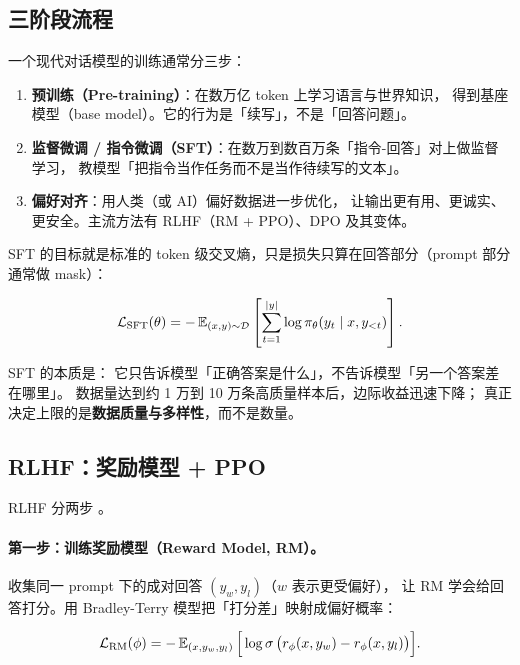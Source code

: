 \subsection{三阶段流程}

一个现代对话模型的训练通常分三步：

\begin{enumerate}
  \item \textbf{预训练（Pre-training）}：在数万亿 token 上学习语言与世界知识，
        得到基座模型（base model）。它的行为是「续写」，不是「回答问题」。
  \item \textbf{监督微调 / 指令微调（SFT）}：在数万到数百万条「指令-回答」对上做监督学习，
        教模型「把指令当作任务而不是当作待续写的文本」。
  \item \textbf{偏好对齐}：用人类（或 AI）偏好数据进一步优化，
        让输出更有用、更诚实、更安全。主流方法有 RLHF（RM + PPO）、DPO 及其变体。
\end{enumerate}

SFT 的目标就是标准的 token 级交叉熵，只是损失只算在回答部分（prompt 部分通常做 mask）：

\begin{equation}
\mathcal{L}_{\text{SFT}}(\theta) = - \operatorname{\mathbb{E}}_{(x, y) \sim \mathcal{D}} \left[ \sum_{t=1}^{|y|} \log \pi_\theta(y_t \mid x, y_{<t}) \right].
\label{eq:sft}
\end{equation}

SFT 的本质是：
它只告诉模型「正确答案是什么」，不告诉模型「另一个答案差在哪里」。
数据量达到约 1 万到 10 万条高质量样本后，边际收益迅速下降；
真正决定上限的是\textbf{数据质量与多样性}，而不是数量。

\subsection{RLHF：奖励模型 + PPO}

RLHF 分两步 \cite{ouyang2022instructgpt}。

\paragraph{第一步：训练奖励模型（Reward Model, RM）。}
收集同一 prompt 下的成对回答 $(y_w, y_l)$（$w$ 表示更受偏好），
让 RM 学会给回答打分。用 Bradley-Terry 模型把「打分差」映射成偏好概率：

\begin{equation}
\mathcal{L}_{\text{RM}}(\phi) = - \operatorname{\mathbb{E}}_{(x, y_w, y_l)} \Big[ \log \operatorname{\sigma}\big( r_\phi(x, y_w) - r_\phi(x, y_l) \big) \Big].
\label{eq:rm-loss}
\end{equation}

